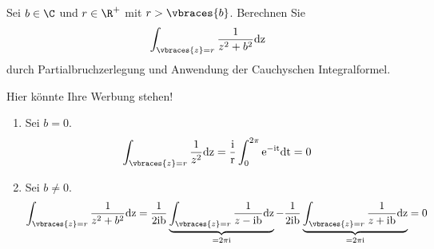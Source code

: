 \begin{exercise}
    Sei $b \in \C$ und $r \in \R^+$ mit $r > \vbraces{b}$. Berechnen Sie 
    \begin{align*}
        \int_{\vbraces{z} = r} \frac{1}{z^2 + b^2} \rm{d}z
    \end{align*}
    durch Partialbruchzerlegung und Anwendung der Cauchyschen Integralformel.
\end{exercise}

\begin{solution}
    Hier könnte Ihre Werbung stehen!
    \begin{enumerate}[label = Fall \arabic*:]
        \item Sei $b = 0$. 
        \begin{align*}
            \int_{\vbraces{z} = r} \frac{1}{z^2} \rm{d}z = \frac{\rm{i}}{r} \int_0^{2\pi}  \rm{e}^{-\rm{i}t} \rm{d}t = 0
        \end{align*}
        \item Sei $b \neq 0$.
        \begin{align*}
            \int_{\vbraces{z} = r} \frac{1}{z^2 + b^2} \rm{d}z = \frac{1}{2\rm{i}b} \underbrace{\int_{\vbraces{z} = r} \frac{1}{z - \rm{i}b} \rm{d}z}_{= 2\pi i} - \frac{1}{2\rm{i}b} \underbrace{\int_{\vbraces{z} = r} \frac{1}{z + \rm{i}b} \rm{d}z}_{= 2\pi i}  = 0
        \end{align*}
    \end{enumerate}
\end{solution}